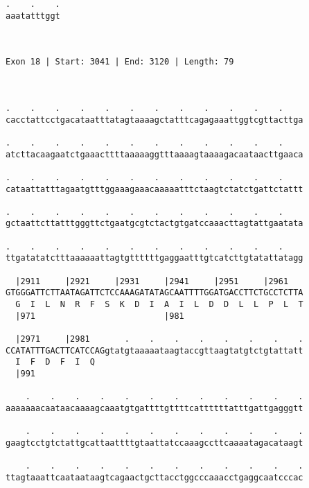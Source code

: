 \documentclass{article}
\begin{document}
\begin{Verbatim}
.    .    .
aaatatttggt
           
           
 
Exon 18 | Start: 3041 | End: 3120 | Length: 79



.    .    .    .    .    .    .    .    .    .    .    .    
cacctattcctgacataatttatagtaaaagctatttcagagaaattggtcgttacttga
                                                            
.    .    .    .    .    .    .    .    .    .    .    .    
atcttacaagaatctgaaacttttaaaaaggtttaaaagtaaaagacaataacttgaaca
                                                            
.    .    .    .    .    .    .    .    .    .    .    .    
cataattatttagaatgtttggaaagaaacaaaaatttctaagtctatctgattctattt
                                                            
.    .    .    .    .    .    .    .    .    .    .    .    
gctaattcttatttgggttctgaatgcgtctactgtgatccaaacttagtattgaatata
                                                            
.    .    .    .    .    .    .    .    .    .    .    .    
ttgatatatctttaaaaaattagtgttttttgaggaatttgtcatcttgtatattatagg
                                                            
  |2911     |2921     |2931     |2941     |2951     |2961   
GTGGGATTCTTAATAGATTCTCCAAAGATATAGCAATTTTGGATGACCTTCTGCCTCTTA
  G  I  L  N  R  F  S  K  D  I  A  I  L  D  D  L  L  P  L  T
  |971                          |981                        
  
  |2971     |2981       .    .    .    .    .    .    .    .
CCATATTTGACTTCATCCAGgtatgtaaaaataagtaccgttaagtatgtctgtattatt
  I  F  D  F  I  Q                                          
  |991                                                      
  
    .    .    .    .    .    .    .    .    .    .    .    .
aaaaaaacaataacaaaagcaaatgtgattttgttttcattttttatttgattgagggtt
                                                            
    .    .    .    .    .    .    .    .    .    .    .    .
gaagtcctgtctattgcattaattttgtaattatccaaagccttcaaaatagacataagt
                                                            
    .    .    .    .    .    .    .    .    .    .    .    .
ttagtaaattcaataataagtcagaactgcttacctggcccaaacctgaggcaatcccac
                                                            

\end{Verbatim}
\end{document}
